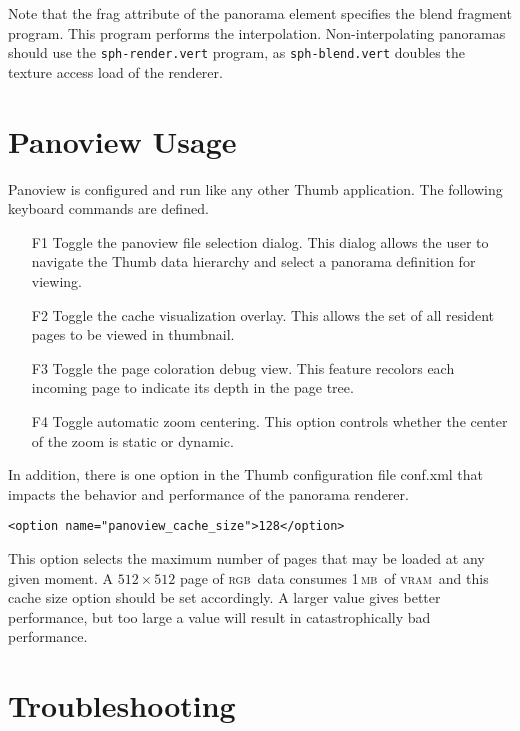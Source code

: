 \documentclass[article,oneside,11pt]{memoir}
\newcommand{\rgb}     {\textsc{rgb}}
\newcommand{\mb}    {\,\textsc{mb}}
\newcommand{\vram}    {\textsc{vram}}
\begin{document}
\begin{Spacing}{1.1}
Note that the frag attribute of the panorama element specifies the blend fragment program. This program performs the interpolation. Non-interpolating panoramas should use the \texttt{sph-render.vert} program, as \texttt{sph-blend.vert} doubles the texture access load of the renderer.

\section{Panoview Usage}

Panoview is configured and run like any other Thumb application. The following keyboard commands are defined.

\begin{itemize}
\item[F1] Toggle the panoview file selection dialog. This dialog allows the user to navigate the Thumb data hierarchy and select a panorama definition for viewing.

\item[F2] Toggle the cache visualization overlay. This allows the set of all resident pages to be viewed in thumbnail.

\item[F3] Toggle the page coloration debug view. This feature recolors each incoming page to indicate its depth in the page tree.

\item[F4] Toggle automatic zoom centering. This option controls whether the center of the zoom is static or dynamic.
\end{itemize}

In addition, there is one option in the Thumb configuration file conf.xml that impacts the behavior and performance of the panorama renderer.

\begin{verbatim}
<option name="panoview_cache_size">128</option>
\end{verbatim}

This option selects the maximum number of pages that may be loaded at any given moment. A $512\times 512$ page of \rgb\ data consumes 1\mb\ of \vram\, and this cache size option should be set accordingly. A larger value gives better performance, but too large a value will result in catastrophically bad performance.

\section{Troubleshooting}


\end{Spacing}
\end{document}
